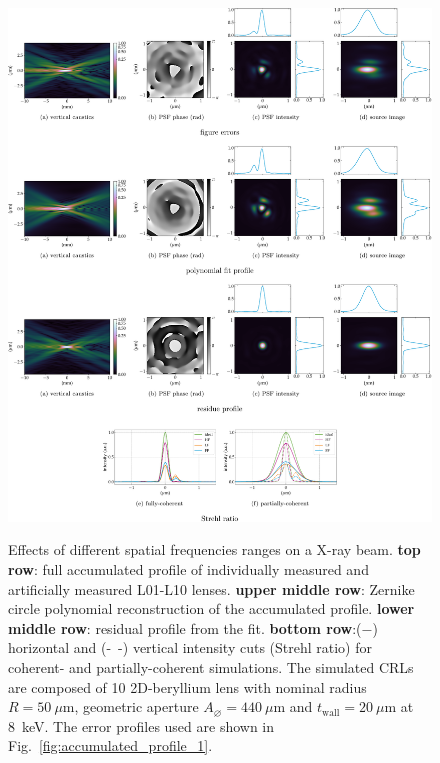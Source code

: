 \begin{refsection}
\begin{figure}[ht]
        \centering
        {\includegraphics[width=1\linewidth]{figures/ch05/CDnFF_LF_HH.pdf}}
        \caption[Effects of different spatial frequencies ranges on a X-ray beam]{Effects of different spatial frequencies ranges on a X-ray beam. \textbf{top row}: full accumulated profile of individually measured and artificially measured L01-L10 lenses. \textbf{upper middle row}: Zernike circle polynomial reconstruction of the accumulated profile. \textbf{lower middle row}: residual profile from the fit. \textbf{bottom row}:($-$) horizontal and (-~-) vertical intensity cuts (Strehl ratio) for coherent- and partially-coherent simulations. The simulated CRLs are composed of 10 2D-beryllium lens with nominal radius $R=50~\mu\text{m}$, geometric aperture $A_{\diameter}=440~\mu\text{m}$ and $t_\text{wall}=20~\mu$m at 8~keV. The error profiles used are shown in Fig.~\ref{fig:accumulated_profile_1}.}\label{fig:CDnFF_LF_HH}
\end{figure}


\end{refsection}
